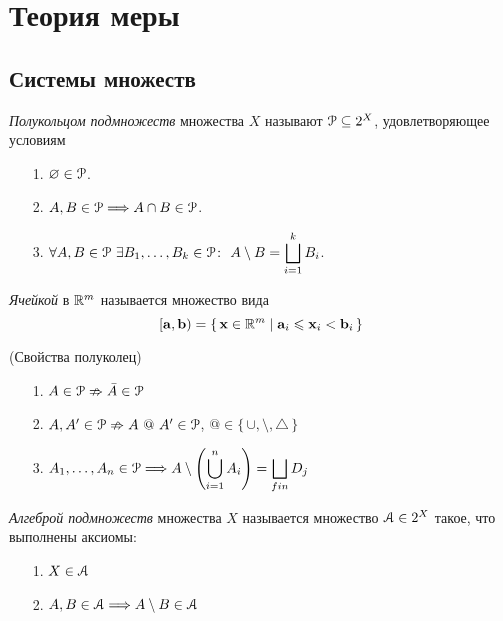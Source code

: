 \chapter{Теория меры}

\section{Системы множеств}

\begin{definition}
    \textit{Полукольцом подмножеств} множества $X$ называют $\mathcal{P} \subseteq 2^X$,
    удовлетворяющее условиям
    \begin{itemize}
        \item[1.] $\varnothing \in \mathcal{P}$.
        \item[2.] $A, B \in \mathcal{P} \Longrightarrow A \cap B \in \mathcal{P}$.
        \item[3.] $\displaystyle \forall A, B \in \mathcal{P}~ \exists B_1, \ldots,
        B_k \in \mathcal{P}\colon~ A \setminus B = \bigsqcup_{i = 1}^{k}{B_i}$.
    \end{itemize}
\end{definition}

\begin{definition}
    \textit{Ячейкой} в $\mathbb{R}^m$ называется множество вида
\[
    [\mathbf{a}, \mathbf{b}) = \{\, \mathbf{x} \in \mathbb{R}^m \mid \mathbf{a}_i \leqslant \mathbf{x}_i < \mathbf{b}_i \,\}
\]
\end{definition}

\begin{theorem}(Свойства полуколец)
    \begin{itemize}
        \item[1.] $A \in \mathcal{P} \nRightarrow \bar{A} \in \mathcal{P}$
        \item[2.] $A, A' \in \mathcal{P} \nRightarrow A~@~A' \in \mathcal{P}$, $@ \in
        \{\, \cup, \setminus, \triangle \,\}$
        \item[3.] $\displaystyle A_1, \ldots, A_n \in \mathcal{P} \Longrightarrow A \setminus
        \left(\bigcup_{i = 1}^{n}{A_i}\right) = \bigsqcup_{fin}{D_j}$
    \end{itemize}
\end{theorem}

\begin{definition}
    \textit{Алгеброй подмножеств} множества $X$ называется множество $\mathcal{A} \in
    2^X$ такое, что выполнены аксиомы:
    \begin{itemize}
        \item[1.] $X \in \mathcal{A}$
        \item[2.] $A, B \in \mathcal{A} \Longrightarrow A \setminus B \in \mathcal{A}$
    \end{itemize}
\end{definition}

